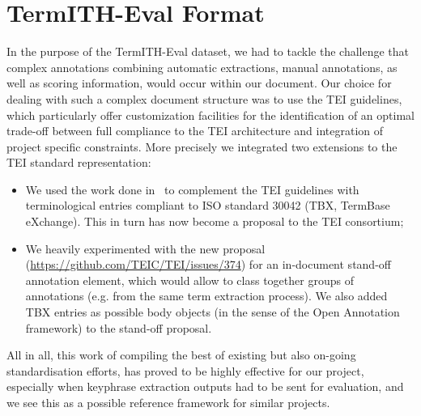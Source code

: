 \section{TermITH-Eval Format}
\label{sec:termith_eval_format}
    In the purpose of the TermITH-Eval dataset, we had to tackle the challenge that complex annotations combining automatic extractions, manual annotations, as well as scoring information, would occur within our document.
    Our choice for dealing with such a complex document structure was to use the TEI guidelines, which particularly offer customization facilities for the identification of an optimal trade-off between full compliance to the TEI architecture and integration of project specific constraints.
    More precisely we integrated two extensions to the TEI standard representation:
    \begin{itemize}
        \item{
            We used the work done in~\cite{romary2010tbxgoestei} to complement the TEI guidelines with terminological entries compliant to ISO standard 30042 (TBX, TermBase eXchange).
            This in turn has now become a proposal to the TEI consortium;
        }
        \item{
            We heavily experimented with the new proposal (\url{https://github.com/TEIC/TEI/issues/374}) for an in-document stand-off annotation element, which would allow to class together groups of annotations (e.g. from the same term extraction process).
            We also added TBX entries as possible body objects (in the sense of the Open Annotation framework) to the stand-off proposal.
        }
    \end{itemize}
    
    All in all, this work of compiling the best of existing but also on-going standardisation efforts, has proved to be highly effective for our project, especially when keyphrase extraction outputs had to be sent for evaluation, and we see this as a possible reference framework for similar projects.

